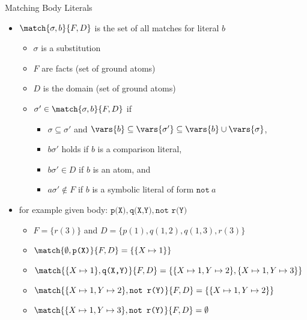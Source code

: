 \begin{frame}{Matching Body Literals}
    \begin{itemize}
      \item \(\match{\sigma,b}{F,D}\) is the set of \alert{all matches for literal} \(b\)
        \begin{itemize}
          \item \(\sigma\) is a substitution
          \item \(F\) are facts (set of ground atoms)
          \item \(D\) is the domain (set of ground atoms)
          \item \(\sigma' \in \match{\sigma,b}{F,D}\) if
            \begin{itemize}
              \item \(\sigma \subseteq \sigma'\) and \(\vars{b} \subseteq \vars{\sigma'} \subseteq \vars{b} \cup \vars{\sigma}\),
              \item \(b\sigma'\) holds if \(b\) is a comparison literal,
              \item \(b\sigma' \in D\) if \(b\) is an atom, and
              \item \(a\sigma' \not\in F\) if \(b\) is a symbolic literal of form \(\texttt{not}\ a\)
            \end{itemize}
        \end{itemize}
      \pause
      \item for \alert{example} given body:  \(\texttt{p(X)},\texttt{q(X,Y)},\texttt{not r(Y)}\)
        \begin{itemize}
          \item \(F = \{r(3)\}\) and \(D = \{p(1), q(1,2), q(1,3), r(3)\}\)
          \item \(\match{\emptyset, \texttt{p(X)}}{F,D} = \{ \{ X \mapsto 1 \} \}\)
          \item \(\match{\{X \mapsto 1\}, \texttt{q(X,Y)}}{F,D} = \{ \{ X \mapsto 1, Y \mapsto 2 \}, \{ X \mapsto 1, Y \mapsto 3 \} \}\)
          \item \(\match{\{X \mapsto 1, Y \mapsto 2 \}, \texttt{not r(Y)}}{F,D} = \{ \{ X \mapsto 1, Y \mapsto 2 \} \}\)
          \item \(\match{\{X \mapsto 1, Y \mapsto 3 \}, \texttt{not r(Y)}}{F,D} = \emptyset\)
        \end{itemize}
    \end{itemize}
\end{frame}
